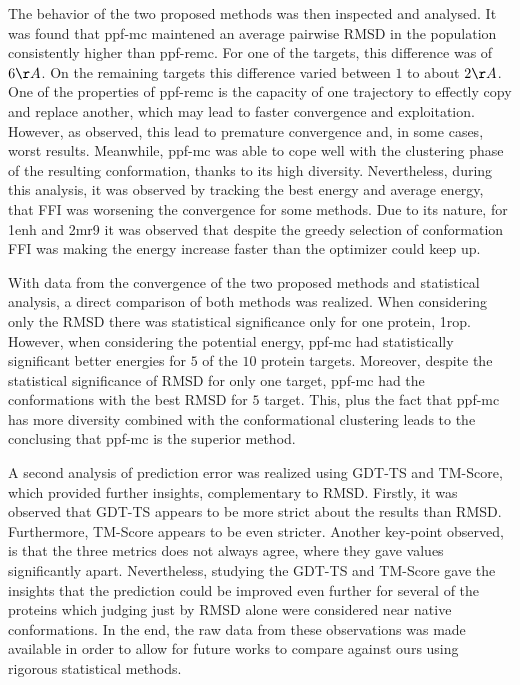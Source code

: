 The behavior of the two proposed methods was then inspected and analysed. It was
found that ppf-mc maintened an average pairwise RMSD in the population
consistently higher than ppf-remc. For one of the targets, this difference was
of $6\AA$. On the remaining targets this difference varied between $1$ to about
$2\AA$. One of the properties of ppf-remc is the capacity of one trajectory to
effectly copy and replace another, which may lead to faster convergence and
exploitation. However, as observed, this lead to premature convergence and, in
some cases, worst results. Meanwhile, ppf-mc was able to cope well with the
clustering phase of the resulting conformation, thanks to its high diversity.
Nevertheless, during this analysis, it was observed by tracking the best energy
and average energy, that FFI was worsening the convergence for some methods.
Due to its nature, for 1enh and 2mr9 it was observed that despite the greedy
selection of conformation FFI was making the energy increase faster than the
optimizer could keep up.

With data from the convergence of the two proposed methods and statistical
analysis, a direct comparison of both methods was realized. When considering
only the RMSD there was statistical significance only for one protein, 1rop.
However, when considering the potential energy, ppf-mc had statistically
significant better energies for $5$ of the $10$ protein targets. Moreover,
despite the statistical significance of RMSD for only one target, ppf-mc had
the conformations with the best RMSD for $5$ target. This, plus the fact that
ppf-mc has more diversity combined with the conformational clustering leads to
the conclusing that ppf-mc is the superior method.




A second analysis of prediction error was realized using GDT-TS and TM-Score,
which provided further insights, complementary to RMSD. Firstly, it was observed
that GDT-TS appears to be more strict about the results than RMSD. Furthermore,
TM-Score appears to be even stricter. Another key-point observed, is that the
three metrics does not always agree, where they gave values significantly
apart. Nevertheless, studying the GDT-TS and TM-Score gave the insights that
the prediction could be improved even further for several of the proteins which
judging just by RMSD alone were considered near native conformations. In the end,
the raw data from these observations was made available in order to allow for
future works to compare against ours using rigorous statistical methods.

